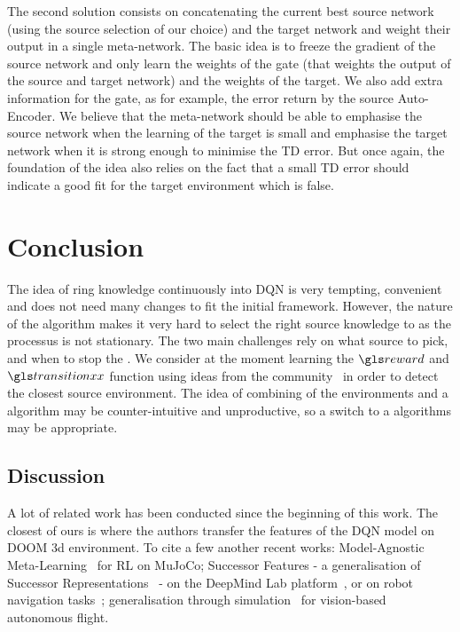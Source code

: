 The second solution consists on concatenating the current best source network (using the source selection of our choice) and the target network and weight their output in a single meta-network. The basic idea is to freeze the gradient of the source network and only learn the weights of the gate (that weights the output of the source and target network) and the weights of the  target. We also add extra information for the gate, as for example, the error return by the source Auto-Encoder. We believe that the meta-network should be able to emphasise the source network when the learning  of the target  is small and emphasise the target network when it is strong enough to minimise the \gls{TD} error. But once again, the foundation of the idea also relies on the fact that a small \gls{TD} error should indicate a good fit for the target environment which is false.

\section{Conclusion}

The idea of ring knowledge continuously into \gls{DQN} is very tempting, convenient and does not need many changes to fit the initial framework. However, the  nature of the algorithm makes it very hard to select the right source knowledge to  as the processus is not stationary. The two main challenges rely on what source to pick, and when to stop the . We consider at the moment learning the $\reward$ and $\transition$ function using ideas from the  community~\parencite{Deisenroth2011} in order to detect the closest source environment. The idea of combining  of the environments and a  algorithm may be counter-intuitive and unproductive, so a switch to a  algorithms may be appropriate.

\subsection{Discussion}

A lot of related work has been conducted since the beginning of this work. The closest of ours is \textcite{chaplot2016transfer} where the authors transfer the features of the \gls{DQN} model on DOOM 3d environment. To cite a few another recent works: Model-Agnostic Meta-Learning~\parencite{finn2017model} for \gls{RL} on MuJoCo; Successor Features - a generalisation of Successor Representations~\parencite{dayan1993improving} -  on the DeepMind Lab platform~\parencite{barreto2019transfer}, or on robot navigation tasks~\parencite{zhang2017deep}; generalisation through simulation~\parencite{kang2019generalization} for vision-based autonomous flight.

